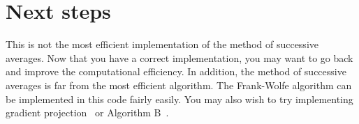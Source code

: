 \documentclass[12pt]{article}
\begin{document}
	
	
	
	
	\section{Next steps}
	
	This is not the most efficient implementation of the method of successive averages. Now that you have a correct implementation, you may want to go back and improve the computational efficiency. In addition, the method of successive averages is far from the most efficient algorithm. The Frank-Wolfe algorithm can be implemented in this code fairly easily. You may also wish to try implementing gradient projection~\citep{jayakrishnan1994faster} or Algorithm B~\citep{dial2006path}.
	
	
	
	
	
	
	
	
	
	
	
\end{document}
